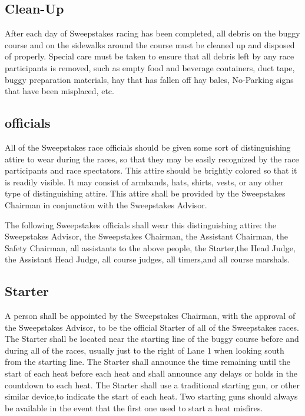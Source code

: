 \subsection{Clean-Up}

After each day of Sweepstakes racing has been completed, all debris on the buggy course and on the sidewalks around the course must be cleaned up and disposed of properly. Special care must be taken to ensure that all debris left by any race participants is removed, such as empty food and beverage containers, duct tape, buggy preparation materials, hay that has fallen off hay bales, No-Parking signs that have been misplaced, etc.

\subsection{officials}

All of the Sweepstakes race officials should be given some sort of distinguishing attire to wear during the races, so that they may be easily recognized by the race participants and race spectators. This attire should be brightly colored so that it is readily visible. It may consist of armbands, hats, shirts, vests, or any other type of distinguishing attire. This attire shall be provided by the Sweepstakes Chairman in conjunction with the Sweepstakes Advisor.

The following Sweepstakes officials shall wear this distinguishing attire: the Sweepstakes Advisor, the Sweepstakes Chairman, the Assistant Chairman, the Safety Chairman, all assistants to the above people, the Starter,the Head Judge, the Assistant Head Judge, all course judges, all timers,and all course marshals.

\subsection{Starter}

A person shall be appointed by the Sweepstakes Chairman, with the approval of the Sweepstakes Advisor, to be the official Starter of all of the Sweepstakes races. The Starter shall be located near the starting line of the buggy course before and during all of the races, usually just to the right of Lane 1 when looking south from the starting line. The Starter shall announce the time remaining until the start of each heat before each heat and shall announce any delays or holds in the countdown to each heat. The Starter shall use a traditional starting gun, or other similar device,to indicate the start of each heat. Two starting guns should always be available in the event that the first one used to start a heat misfires.


